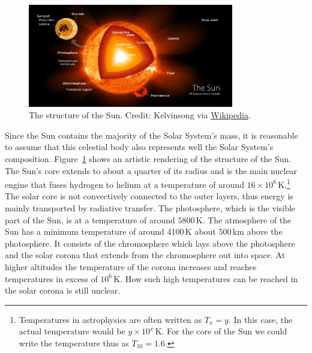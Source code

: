 \begin{figure}[tb]
    \centering
    \includegraphics[width=0.8\textwidth]{graphics/solar_system_abundances/sun_structure}
    \caption{The structure of the Sun. Credit: Kelvinsong via \href{https://en.wikipedia.org/wiki/Sun}{Wikipedia}.}
    \label{fig:Sun_structure}
\end{figure}
Since the Sun contains the majority of the Solar System's mass, it is reasonable to assume that this celestial body also represents well the Solar System's composition. Figure~\ref{fig:Sun_structure} shows an artistic rendering of the structure of the Sun. The Sun's core extends to about a quarter of its radius and is the main nuclear engine that fuses hydrogen to helium at a temperature of around $16\times10^{6}$\,K.\footnote{Temperatures in astrophysics are often written as $T_x = y$. In this case, the actual temperature would be $y\times10^{x}$\,K. For the core of the Sun we could write the temperature thus as $T_{10} = 1.6$.} The solar core is not convectively connected to the outer layers, thus energy is mainly transported by radiative transfer. The photosphere, which is the visible part of the Sun, is at a temperature of around $5800$\,K. The atmosphere of the Sun has a minimum temperature of around 4100\,K about 500\,km above the photosphere. It consists of the chromosphere which lays above the photosphere and the solar corona that extends from the chromosphere out into space. At higher altitudes the temperature of the corona increases and reaches temperatures in excess of $10^6$\,K. How such high temperatures can be reached in the solar corona is still unclear.



